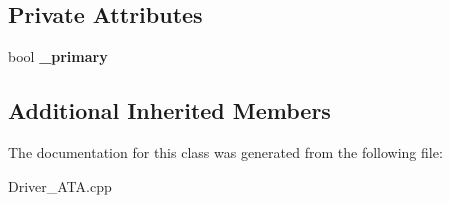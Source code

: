 \subsection*{Private Attributes}
\begin{DoxyCompactItemize}
\item 
\mbox{\label{class_a_t_a_driver_node___p_c_i_1_1_factory_1_1_match_a6f6e86630d0b34b9c2d89b91cdd37879}} 
bool {\bfseries \+\_\+primary}
\end{DoxyCompactItemize}
\subsection*{Additional Inherited Members}


The documentation for this class was generated from the following file\+:\begin{DoxyCompactItemize}
\item 
Driver\+\_\+\+A\+T\+A.\+cpp\end{DoxyCompactItemize}
